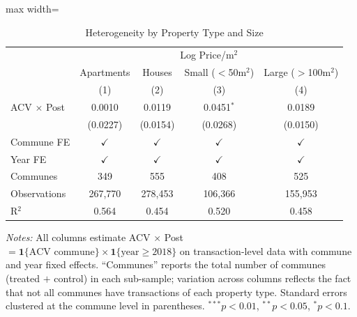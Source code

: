 \begin{table}[htbp]
   \caption{\label{tab:heterogeneity} Heterogeneity by Property Type and Size}
   \bigskip
   \centering
   \begin{adjustbox}{max width=\textwidth}
   \begin{tabular}{lcccc}
      \toprule
       & \multicolumn{4}{c}{Log Price/m$^2$}\\
                                   & Apartments    & Houses        & Small ($<$50m$^2$) & Large ($>$100m$^2$) \\
                                   & (1)           & (2)           & (3)           & (4)\\
      \midrule
      ACV $\times$ Post            & 0.0010        & 0.0119        & 0.0451$^{*}$  & 0.0189\\
                                   & (0.0227)      & (0.0154)      & (0.0268)      & (0.0150)\\
      \midrule
      Commune FE                   & $\checkmark$  & $\checkmark$  & $\checkmark$  & $\checkmark$\\
      Year FE                      & $\checkmark$  & $\checkmark$  & $\checkmark$  & $\checkmark$\\
      \midrule
      Communes                     & 349           & 555           & 408           & 525\\
      Observations                 & 267,770       & 278,453       & 106,366       & 155,953\\
      R$^2$                        & 0.564         & 0.454         & 0.520         & 0.458\\
      \bottomrule
   \end{tabular}
   \end{adjustbox}

   \par \raggedright \small
   \textit{Notes:} All columns estimate ACV $\times$ Post $= \mathbf{1}\{\text{ACV commune}\} \times \mathbf{1}\{\text{year} \geq 2018\}$ on transaction-level data with commune and year fixed effects. ``Communes'' reports the total number of communes (treated $+$ control) in each sub-sample; variation across columns reflects the fact that not all communes have transactions of each property type. Standard errors clustered at the commune level in parentheses. $^{***}p<0.01$, $^{**}p<0.05$, $^{*}p<0.1$.
\end{table}
